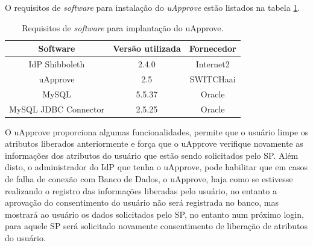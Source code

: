 O requisitos de \textit{software} para instalação do \textit{uApprove} estão listados na tabela \ref{tab_4}.

\begin{table}[!htpb]
   \begin{small}
	\centering
	\begin{tabular}{|c|c|c|} \hline
		Software & Versão utilizada & Fornecedor \\ \hline
		IdP Shibboleth & 2.4.0 & Internet2\\ \hline
		uApprove & 2.5 & SWITCHaai\\ \hline
		MySQL & 5.5.37 & Oracle\\ \hline
		MySQL JDBC Connector & 2.5.25 & Oracle\\ \hline
	\end{tabular}
	\caption{Requisitos de \textit{software} para implantação do uApprove.}
	\label{tab_4}  	
  \end{small}
\end{table}

O uApprove proporciona algumas funcionalidades, permite que o usuário limpe os atributos liberados anteriormente e força que o uApprove verifique novamente as informações dos atributos do usuário que estão sendo solicitados pelo SP. Além disto, o administrador do IdP que tenha o uApprove, pode habilitar que em casos de falha de conexão com Banco de Dados, o uApprove, haja como se estivesse realizando o registro das informações liberadas pelo usuário, no entanto a aprovação do consentimento do usuário não será registrada no banco, mas mostrará ao usuário os dados solicitados pelo SP, no entanto num próximo login, para aquele SP será solicitado novamente consentimento de liberação de atributos do usuário.